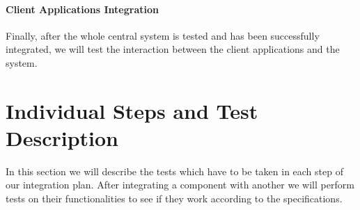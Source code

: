 \documentclass[english]{article}
\begin{document}
\begin{figure}[H]
	\centering
\end{figure}


\paragraph{Client Applications Integration}
Finally, after the whole central system is tested and has been successfully integrated, we will test the interaction between the client applications and the system.

\begin{figure}[H]
	\centering
\end{figure}


\newpage
\section{Individual Steps and Test Description}

In this section we will describe the tests which have to be taken in each step of our integration plan.
After integrating a component with another we will perform tests on their functionalities to see if they work according to the specifications.
\end{document}
